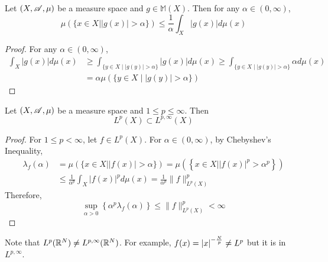 \begin{prop}
	Let $(X,\mathscr{A},\mu)$ be a measure space and $g \in \mathbb{M}(X)$. Then for any $\alpha \in (0,\infty)$,
	\begin{equation*}
		\mu\left(\{x \in X||g(x)|>\alpha\}\right) \leq \frac{1}{\alpha} \int_X|g(x)| d \mu(x)
	\end{equation*}
\end{prop}
\begin{proof}
	For any $\alpha \in (0,\infty)$,
	\begin{equation*}
		\begin{aligned}
			\int_X|g(x)| d \mu(x) & \geq \int_{\{y \in X \mid | g(y) |>\alpha\}}|g(x)| d \mu(x) \geq \int_{\{y \in X \mid | g(y) \mid>\alpha\}} \alpha d \mu(x) \\
			& =\alpha \mu(\{y \in X \mid | g(y) \mid>\alpha\})
		\end{aligned}
	\end{equation*}
\end{proof}

\begin{prop}
	Let $(X,\mathscr{A},\mu)$ be a measure space and $1 \leq p \leq \infty$. Then
	\begin{equation*}
		L^p(X) \subset L^{p, \infty}(X)
	\end{equation*}
\end{prop}
\begin{proof}
	For $1 \leq p < \infty$, let $f \in L^p(X)$. For $\alpha \in (0,\infty)$, by Chebyshev's Inequality,
	\begin{equation*}
		\begin{aligned}
			\lambda_f(\alpha) & =\mu(\{x \in X| | f(x) \mid>\alpha\})=\mu\left(\left\{\left.x \in X| | f(x)\right|^p>\alpha^p\right\}\right) \\
			& \leq \frac{1}{\alpha^p} \int_X|f(x)|^p d \mu(x)=\frac{1}{\alpha^p}\|f\|_{L^p(X)}^p
		\end{aligned}
	\end{equation*}
	Therefore,
	\begin{equation*}
		\sup _{\alpha>0}\left\{\alpha^p \lambda_f(\alpha)\right\} \leq\|f\|_{L^p(X)}^p<\infty
	\end{equation*}
\end{proof}
\begin{rmk}
	Note that $L^p(\mathbb{R}^N) \neq L^{p,\infty}(\mathbb{R}^N)$. For example, $f(x) = \left\lvert x\right\lvert^{-\frac{N}{p}} \neq L^p$ but it is in $L^{p,\infty}$.
\end{rmk}


